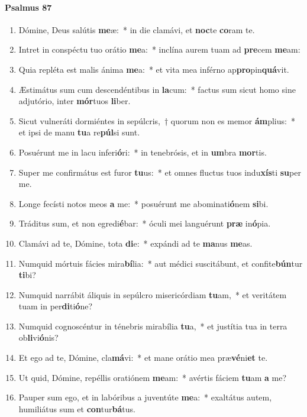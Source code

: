 \documentclass[twoside]{article}
\begin{document}
\begin{paracol}[1]{2}
\paragraph{Psalmus 87}
\begin{enumerate}[wide, itemsep=0mm, labelwidth=!, labelindent=0pt, label=\color{gregoriocolor}\theenumi]
\item Dómine, Deus salútis \textbf{me}æ:~* in die clamávi, et \textbf{noc}te \textbf{co}ram te.
\item Intret in conspéctu tuo orátio \textbf{me}a:~* inclína aurem tuam ad \textbf{pre}cem \textbf{me}am:
\item Quia repléta est malis ánima \textbf{me}a:~* et vita mea inférno ap\textbf{pro}pin\textbf{quá}vit.
\item Æstimátus sum cum descendéntibus in \textbf{la}cum:~* factus sum sicut homo sine adjutório, inter \textbf{mór}tuos \textbf{li}ber.
\item Sicut vulneráti dormiéntes in sepúlcris,~† quorum non es memor \textbf{ám}plius:~* et ipsi de manu \textbf{tu}a re\textbf{púl}si sunt.
\item Posuérunt me in lacu inferi\textbf{ó}ri:~* in tenebrósis, et in \textbf{um}bra \textbf{mor}tis.
\item Super me confirmátus est furor \textbf{tu}us:~* et omnes fluctus tuos indu\textbf{xís}ti \textbf{su}per me.
\item Longe fecísti notos meos \textbf{a} me:~* posuérunt me abominati\textbf{ó}nem \textbf{si}bi.
\item Tráditus sum, et non egredi\textbf{é}bar:~* óculi mei languérunt \textbf{præ} in\textbf{ó}pia.
\item Clamávi ad te, Dómine, tota \textbf{di}e:~* expándi ad te \textbf{ma}nus \textbf{me}as.
\item Numquid mórtuis fácies mira\textbf{bí}lia:~* aut médici suscitábunt, et confite\textbf{bún}tur \textbf{ti}bi?
\item Numquid narrábit áliquis in sepúlcro misericórdiam \textbf{tu}am,~* et veritátem tuam in per\textbf{di}ti\textbf{ó}ne?
\item Numquid cognoscéntur in ténebris mirabília \textbf{tu}a,~* et justítia tua in terra ob\textbf{li}vi\textbf{ó}nis?
\item Et ego ad te, Dómine, cla\textbf{má}vi:~* et mane orátio mea præ\textbf{vé}ni\textbf{et} te.
\item Ut quid, Dómine, repéllis oratiónem \textbf{me}am:~* avértis fáciem \textbf{tu}am \textbf{a} me?
\item Pauper sum ego, et in labóribus a juventúte \textbf{me}a:~* exaltátus autem, humiliátus sum et \textbf{con}tur\textbf{bá}tus.

\end{enumerate}
\end{paracol}
\end{document}
